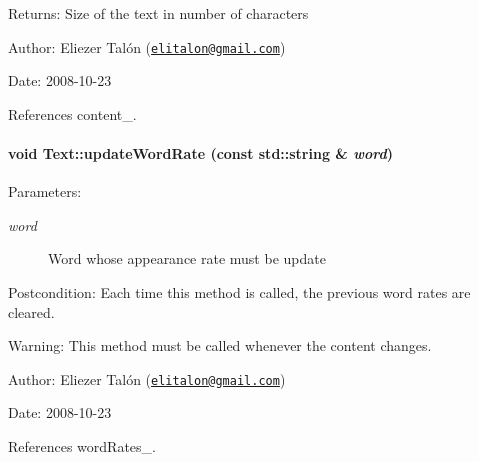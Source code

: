 \begin{Desc}
\item[Returns:]Size of the text in number of characters\end{Desc}
\begin{Desc}
\item[Author:]Eliezer Talón (\href{mailto:elitalon@gmail.com}{\tt elitalon@gmail.com}) \end{Desc}
\begin{Desc}
\item[Date:]2008-10-23 \end{Desc}


References content\_\-.\hypertarget{class_text_5ab8f9bfa566de537a167991fe10eff5}{
\paragraph[{updateWordRate}]{\setlength{\rightskip}{0pt plus 5cm}void Text::updateWordRate (const std::string \& {\em word})}\hfill}
\label{class_text_5ab8f9bfa566de537a167991fe10eff5}


\begin{Desc}
\item[Parameters:]
\begin{description}
\item[{\em word}]Word whose appearance rate must be update\end{description}
\end{Desc}
\begin{Desc}
\item[Postcondition:]Each time this method is called, the previous word rates are cleared.\end{Desc}
\begin{Desc}
\item[Warning:]This method must be called whenever the content changes.\end{Desc}
\begin{Desc}
\item[Author:]Eliezer Talón (\href{mailto:elitalon@gmail.com}{\tt elitalon@gmail.com}) \end{Desc}
\begin{Desc}
\item[Date:]2008-10-23 \end{Desc}


References wordRates\_\-.

